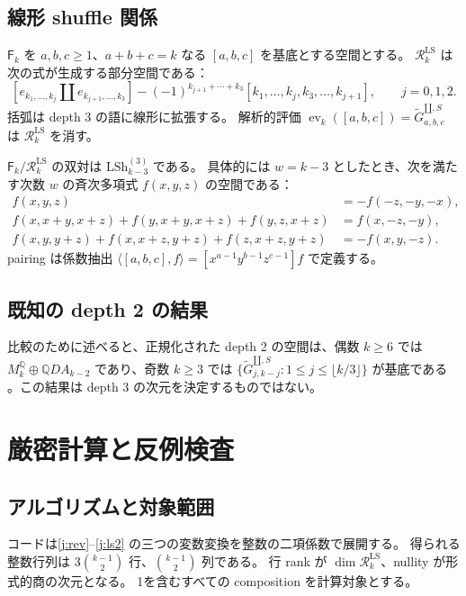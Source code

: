 \documentclass[12pt]{amsart}
\theoremstyle{definition}
\theoremstyle{remark}
\numberwithin{equation}{section}
\newcommand{\Q}{\mathbb{Q}}
\newcommand{\sh}{\mathbin{\amalg}}
\newcommand{\sG}[1]{\widetilde G^{\sh,S}_{#1}}
\newcommand{\LS}{\mathrm{LSh}}
\newcommand{\ev}{\operatorname{ev}}
\newcommand{\RR}{\mathcal R^{\mathrm{LS}}}
\newcommand{\FF}{\mathsf F}
\numberwithin{equation}{section}
\begin{document}
\subsection{線形 shuffle 関係}
$\FF_k$ を $a,b,c\ge1$、$a+b+c=k$ なる $[a,b,c]$ を基底とする空間とする。
$\RR_k$ は次の式が生成する部分空間である：
\begin{equation}\label{j:lswords}
 [e_{k_1,\ldots,k_j}\sh e_{k_{j+1},\ldots,k_3}]
 -(-1)^{k_{j+1}+\cdots+k_3}
 [k_1,\ldots,k_j,k_3,\ldots,k_{j+1}],\qquad j=0,1,2.
\end{equation}
括弧は depth 3 の語に線形に拡張する。
解析的評価 $\ev_k([a,b,c])=\sG{a,b,c}$ は $\RR_k$ を消す。

$\FF_k/\RR_k$ の双対は $\LS_{k-3}^{(3)}$ である。
具体的には $w=k-3$ としたとき、次を満たす次数 $w$ の斉次多項式 $f(x,y,z)$ の空間である：
\begin{align}
 f(x,y,z)&=-f(-z,-y,-x),\label{j:rev}\\
 f(x,x+y,x+z)+f(y,x+y,x+z)+f(y,z,x+z)&=f(x,-z,-y),\label{j:ls1}\\
 f(x,y,y+z)+f(x,x+z,y+z)+f(z,x+z,y+z)&=-f(x,y,-z).\label{j:ls2}
\end{align}
pairing は係数抽出
$\langle[a,b,c],f\rangle=[x^{a-1}y^{b-1}z^{c-1}]f$ で定義する。

\subsection{既知の depth 2 の結果}
比較のために述べると、正規化された depth 2 の空間は、偶数 $k\ge6$ では
$M_k^{\Q}\oplus\Q D A_{k-2}$ であり、奇数 $k\ge3$ では
$\{\sG{j,k-j}:1\le j\le\lfloor k/3\rfloor\}$ が基底である
\cite[Theorem 1.2]{j-hst}。この結果は depth 3 の次元を決定するものではない。

\section{厳密計算と反例検査}
\subsection{アルゴリズムと対象範囲}
コードは\eqref{j:rev}--\eqref{j:ls2} の三つの変数変換を整数の二項係数で展開する。
得られる整数行列は $3\binom{k-1}{2}$ 行、$\binom{k-1}{2}$ 列である。
行 rank が $\dim\RR_k$、nullity が形式的商の次元となる。
1を含むすべての composition を計算対象とする。
\end{document}
